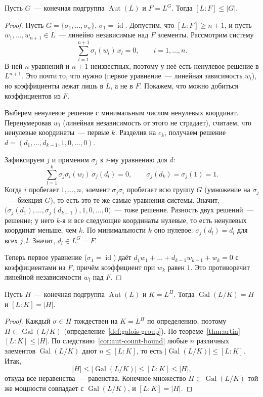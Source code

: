 \documentclass[12pt]{article}
\begin{document}
	\begin{theorem}\label{thm:artin}
		Пусть $G$~--- конечная подгруппа $\operatorname{Aut}(L)$ и $F = L^G$. Тогда $[L:F] \leqslant |G|$.
	\end{theorem}
	\begin{proof}
		Пусть $G = \{\sigma_1, \ldots, \sigma_n\}$, $\sigma_1 = \operatorname{id}$. Допустим, что $[L:F] \geqslant n+1$, и пусть $w_1, \ldots, w_{n+1} \in L$~--- линейно независимые над $F$ элементы. Рассмотрим систему
		\[
			\sum_{l=1}^{n+1} \sigma_i(w_l)\,x_l = 0, \qquad i = 1, \ldots, n.
		\]
		В ней $n$ уравнений и $n+1$ неизвестных, поэтому у неё есть ненулевое решение в $L^{n+1}$. Это почти то, что нужно (первое уравнение~--- линейная зависимость $w_l$), но коэффициенты лежат лишь в $L$, а не в $F$. Покажем, что можно добиться коэффициентов из $F$.

		Выберем ненулевое решение с минимальным числом ненулевых координат. Перенумеровав $w_l$ (линейная независимость от этого не страдает), считаем, что ненулевые координаты~--- первые $k$. Разделив на $c_k$, получаем решение $d = (d_1, \ldots, d_{k-1}, 1, 0, \ldots, 0)$.

		Зафиксируем $j$ и применим $\sigma_j$ к $i$-му уравнению для $d$:
		\[
			\sum_{l=1}^{k} \sigma_j\sigma_i(w_l)\,\sigma_j(d_l) = 0, \qquad \sigma_j(d_k) = \sigma_j(1) = 1.
		\]
		Когда $i$ пробегает $1, \ldots, n$, элемент $\sigma_j\sigma_i$ пробегает всю группу $G$ (умножение на $\sigma_j$~--- биекция $G$), то есть это те же самые уравнения системы. Значит, $\bigl(\sigma_j(d_1), \ldots, \sigma_j(d_{k-1}), 1, 0, \ldots, 0\bigr)$~--- тоже решение. Разность двух решений~--- решение; у него $k$-я и все следующие координаты нулевые, то есть ненулевых координат меньше, чем $k$. По минимальности $k$ оно нулевое: $\sigma_j(d_l) = d_l$ для всех $j, l$. Значит, $d_l \in L^G = F$.

		Теперь первое уравнение ($\sigma_1 = \operatorname{id}$) даёт $d_1w_1 + \ldots + d_{k-1}w_{k-1} + w_k = 0$ с коэффициентами из $F$, причём коэффициент при $w_k$ равен $1$. Это противоречит линейной независимости $w_l$ над $F$.
	\end{proof}

	\begin{theorem}[Артина]\label{thm:fixed-field-galois}
		Пусть $H$~--- конечная подгруппа $\operatorname{Aut}(L)$ и $K = L^H$. Тогда $\operatorname{Gal}(L/K) = H$ и $[L:K] = |H|$.
	\end{theorem}
	\begin{proof}
		Каждый $\sigma \in H$ тождествен на $K = L^H$ по определению, поэтому $H \subset \operatorname{Gal}(L/K)$ (определение~\ref{def:galois-group}). По теореме~\ref{thm:artin} $[L:K] \leqslant |H|$. По следствию~\ref{cor:aut-count-bound} любые $n$ различных элементов $\operatorname{Gal}(L/K)$ дают $n \leqslant [L:K]$, то есть $|\operatorname{Gal}(L/K)| \leqslant [L:K]$. Итак,
		\[
			|H| \leqslant |\operatorname{Gal}(L/K)| \leqslant [L:K] \leqslant |H|,
		\]
		откуда все неравенства~--- равенства. Конечное множество $H \subset \operatorname{Gal}(L/K)$ той же мощности совпадает с $\operatorname{Gal}(L/K)$, и $[L:K] = |H|$.
	\end{proof}
	
\end{document}
